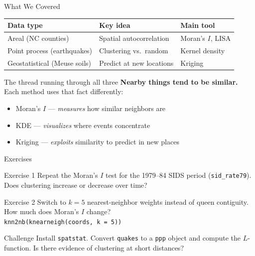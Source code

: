 \documentclass[aspectratio=169, 12pt]{beamer}
\newcommand{\pkg}[1]{\texttt{\color{spataccent}#1}}
\begin{document}
\begin{frame}{What We Covered}
  \vspace{0.3em}
  \begin{tabular}{lll}
    \toprule
    \textbf{Data type} & \textbf{Key idea} & \textbf{Main tool}\\
    \midrule
    Areal (NC counties) & Spatial autocorrelation & Moran's $I$, LISA\\
    Point process (earthquakes) & Clustering vs.\ random & Kernel density\\
    Geostatistical (Meuse soils) & Predict at new locations & Kriging\\
    \bottomrule
  \end{tabular}
  \vspace{0.7em}
  \begin{block}{The thread running through all three}
    \textbf{Nearby things tend to be similar.} Each method uses that fact differently:
    \begin{itemize}
      \item Moran's $I$ --- \textit{measures} how similar neighbors are
      \item KDE --- \textit{visualizes} where events concentrate
      \item Kriging --- \textit{exploits} similarity to predict in new places
    \end{itemize}
  \end{block}
\end{frame}


\begin{frame}{Exercises}
  \begin{block}{Exercise 1}
    Repeat the Moran's $I$ test for the 1979--84 SIDS period (\texttt{sid\_rate79}). Does clustering increase or decrease over time?
  \end{block}
  \vspace{0.4em}
  \begin{block}{Exercise 2}
    Switch to $k = 5$ nearest-neighbor weights instead of queen contiguity. How much does Moran's $I$ change?\\[4pt]
    \texttt{knn2nb(knearneigh(coords, k = 5))}
  \end{block}
  \vspace{0.4em}
  \begin{alertblock}{Challenge}
    Install \pkg{spatstat}. Convert \texttt{quakes} to a \texttt{ppp} object and compute the $L$-function. Is there evidence of clustering at short distances?
  \end{alertblock}
\end{frame}
\end{document}
